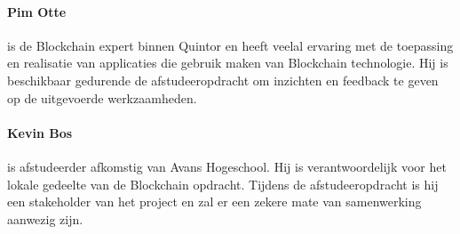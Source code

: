\paragraph{Pim Otte} \label{expert} is de Blockchain expert binnen Quintor en heeft veelal ervaring met de toepassing en realisatie van applicaties die gebruik maken van Blockchain technologie. Hij is beschikbaar gedurende de afstudeeropdracht om inzichten en feedback te geven op de uitgevoerde werkzaamheden.

\paragraph{Kevin Bos} is afstudeerder afkomstig van Avans Hogeschool. Hij is verantwoordelijk voor het lokale gedeelte van de Blockchain opdracht. Tijdens de afstudeeropdracht is hij een stakeholder van het project en zal er een zekere mate van samenwerking aanwezig zijn.